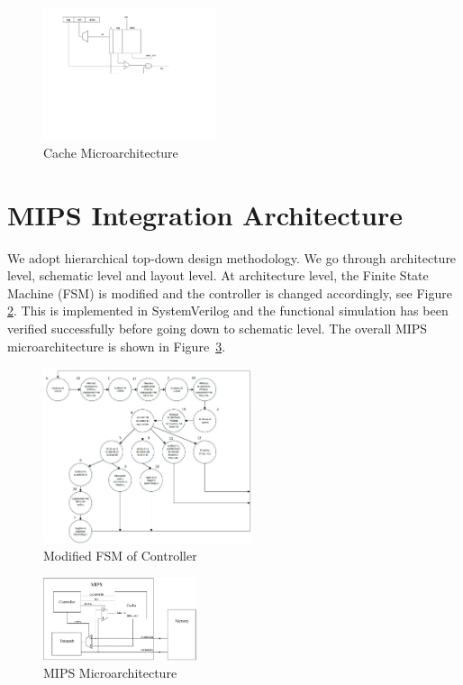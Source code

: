 \documentclass[conference]{IEEEtran}
\begin{document}
\begin{figure}[h!]
  \centering
    \includegraphics[width=0.45\textwidth]{cache_arch}
  \caption{Cache Microarchitecture}
  \label{fig:cache_arch}
\end{figure}

\section{MIPS Integration Architecture}\label{arch}
We adopt hierarchical top-down design methodology. We go through architecture
level, schematic level and layout level. At architecture level, the Finite
State Machine (FSM) is modified and the controller is changed accordingly, see
Figure \ref{fig:fsm}. This is implemented in SystemVerilog and the functional simulation has
been verified successfully before going down to schematic level. The overall
MIPS microarchitecture is shown in Figure~\ref{fig:arch}.

\begin{figure}[h!]
  \centering
    \includegraphics[width=0.55\textwidth]{fsm}
  \caption{Modified FSM of Controller}
  \label{fig:fsm}
\end{figure}

\begin{figure}[h!]
  \centering
    \includegraphics[width=0.4\textwidth]{arch.pdf}
  \caption{MIPS Microarchitecture}
  \label{fig:arch}
\end{figure}
\end{document}
